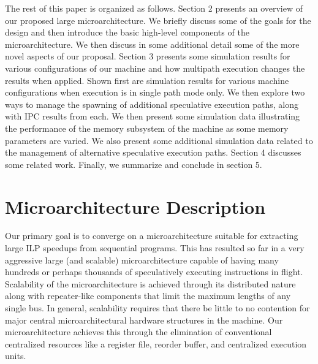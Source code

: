 \documentclass[10pt,dvips]{article}
\begin{document}
The rest of this paper is organized as follows.
Section 2 presents an overview of our proposed large
microarchitecture.
We briefly discuss some of the goals for the design
and then introduce
the basic high-level components of the microarchitecture.
We then discuss in some
additional detail some of the more novel aspects of
our proposal.
Section 3 presents some simulation results for various
configurations of our machine and how multipath execution
changes the results when applied.  Shown first are simulation
results for various machine configurations when execution is in
single path mode only.  We then explore two ways to manage
the spawning of additional
speculative execution paths, along with IPC results from each.
We then present some simulation data illustrating
the performance of the memory subsystem of the machine as some
memory parameters are varied.
We also present some additional simulation data related
to the management of alternative speculative execution paths.
Section 4 discusses some related work.
Finally, we summarize and conclude in section 5.
%
\section{Microarchitecture Description}
%
Our primary goal is to converge on a microarchitecture suitable
for extracting large ILP speedups from sequential programs.
This has resulted so far in a very aggressive large (and scalable)
microarchitecture capable of having many hundreds or perhaps thousands
of speculatively executing instructions in flight.  Scalability
of the microarchitecture is achieved through its distributed nature
along with repeater-like components that limit the maximum lengths
of any single bus.
In general, scalability requires that there be little to no 
contention for major
central microarchitectural hardware structures in the machine.
Our microarchitecture achieves this through the elimination
of conventional centralized resources like a register file,
reorder buffer, and centralized execution units.
\end{document}
